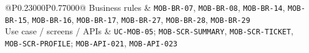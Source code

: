 \begin{longtable}{@{}P{0.23000\SRSWidth}P{0.77000\SRSWidth}@{}}
Business rules & \texttt{MOB-\allowbreak{}BR-\allowbreak{}07}, \texttt{MOB-\allowbreak{}BR-\allowbreak{}08}, \texttt{MOB-\allowbreak{}BR-\allowbreak{}14}, \texttt{MOB-\allowbreak{}BR-\allowbreak{}15}, \texttt{MOB-\allowbreak{}BR-\allowbreak{}16}, \texttt{MOB-\allowbreak{}BR-\allowbreak{}17}, \texttt{MOB-\allowbreak{}BR-\allowbreak{}27}, \texttt{MOB-\allowbreak{}BR-\allowbreak{}28}, \texttt{MOB-\allowbreak{}BR-\allowbreak{}29} \\[3pt]
Use case /\allowbreak{} screens /\allowbreak{} APIs & \texttt{UC-\allowbreak{}MOB-\allowbreak{}05}; \texttt{MOB-\allowbreak{}SCR-\allowbreak{}SUMMARY}, \texttt{MOB-\allowbreak{}SCR-\allowbreak{}TICKET}, \texttt{MOB-\allowbreak{}SCR-\allowbreak{}PROFILE}; \texttt{MOB-\allowbreak{}API-\allowbreak{}021}, \texttt{MOB-\allowbreak{}API-\allowbreak{}023} \\[3pt]
\end{longtable}
\endgroup

